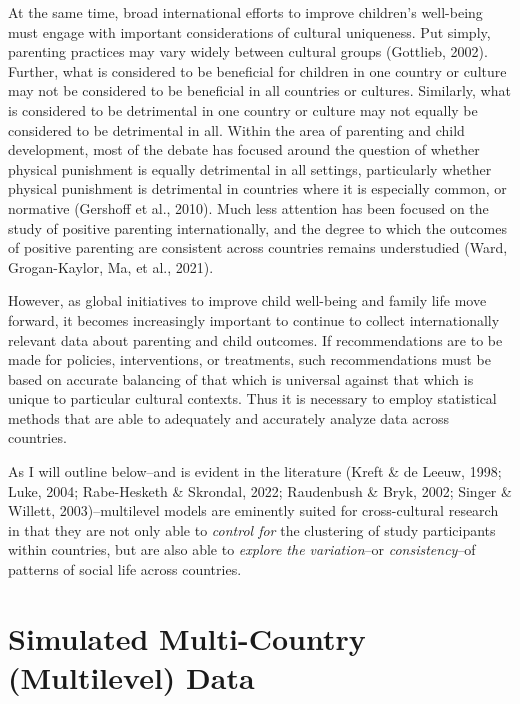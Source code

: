 \documentclass[
  letterpaper,
  DIV=11,
  numbers=noendperiod]{scrreprt}
\begin{document}
At the same time, broad international efforts to improve children's
well-being must engage with important considerations of cultural
uniqueness. Put simply, parenting practices may vary widely between
cultural groups (Gottlieb, 2002). Further, what is considered to be
beneficial for children in one country or culture may not be considered
to be beneficial in all countries or cultures. Similarly, what is
considered to be detrimental in one country or culture may not equally
be considered to be detrimental in all. Within the area of parenting and
child development, most of the debate has focused around the question of
whether physical punishment is equally detrimental in all settings,
particularly whether physical punishment is detrimental in countries
where it is especially common, or normative (Gershoff et al., 2010).
Much less attention has been focused on the study of positive parenting
internationally, and the degree to which the outcomes of positive
parenting are consistent across countries remains understudied (Ward,
Grogan-Kaylor, Ma, et al., 2021).

However, as global initiatives to improve child well-being and family
life move forward, it becomes increasingly important to continue to
collect internationally relevant data about parenting and child
outcomes. If recommendations are to be made for policies, interventions,
or treatments, such recommendations must be based on accurate balancing
of that which is universal against that which is unique to particular
cultural contexts. Thus it is necessary to employ statistical methods
that are able to adequately and accurately analyze data across
countries.

As I will outline below--and is evident in the literature (Kreft \& de
Leeuw, 1998; Luke, 2004; Rabe-Hesketh \& Skrondal, 2022; Raudenbush \&
Bryk, 2002; Singer \& Willett, 2003)--multilevel models are eminently
suited for cross-cultural research in that they are not only able to
\emph{control for} the clustering of study participants within
countries, but are also able to \emph{explore the variation}--or
\emph{consistency}--of patterns of social life across countries.


\chapter{Simulated Multi-Country (Multilevel)
Data}\label{sec-simulateddata}
\end{document}
